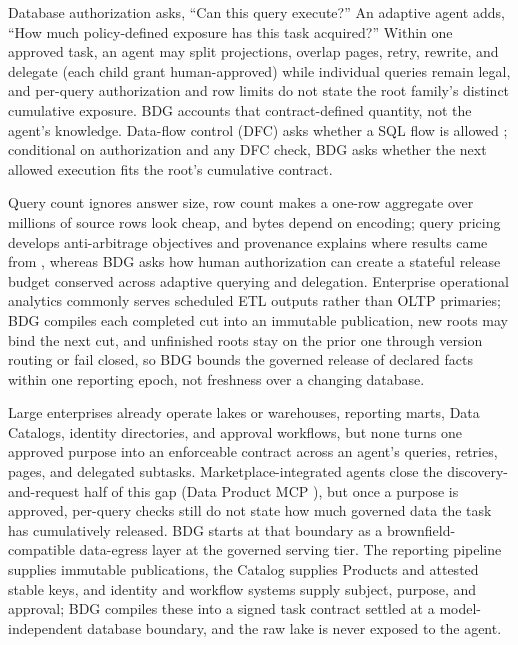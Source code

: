\documentclass[10pt,journal,compsoc]{IEEEtran}
\providecommand{\IEEEPARstart}[2]{#1#2}
\begin{document}
\IEEEPARstart{D}{atabase} authorization asks, ``Can this query execute?''
An adaptive agent adds, ``How much policy-defined exposure has this task
acquired?'' Within one approved task, an agent may split projections,
overlap pages, retry, rewrite, and delegate (each child grant
human-approved) while individual queries remain legal, and per-query
authorization and row limits do not state the root family's distinct
cumulative exposure. BDG accounts that contract-defined quantity, not the
agent's knowledge. Data-flow control (DFC) asks whether a SQL flow is
allowed \cite{summers2026dataflow,summers2026passant}; conditional on
authorization and any DFC check, BDG asks whether the next allowed execution
fits the root's cumulative contract.

Query count ignores answer size, row count makes a one-row aggregate over
millions of source rows look cheap, and bytes depend on encoding; query
pricing develops anti-arbitrage objectives
\cite{koutris2012query,deep2017qirana,peng2025aria} and provenance explains
where results came from \cite{green2007provenance,amsterdamer2011aggregate},
whereas BDG asks how human authorization can create a stateful release
budget conserved across adaptive querying and delegation. Enterprise
operational analytics commonly serves scheduled ETL outputs rather than
OLTP primaries; BDG compiles each completed cut into an immutable
publication, new roots may bind the next cut, and unfinished roots stay on
the prior one through version routing or fail closed, so BDG bounds the
governed release of declared facts within one reporting epoch, not
freshness over a changing database.

Large enterprises already operate lakes or warehouses, reporting marts, Data
Catalogs, identity directories, and approval workflows, but none turns one
approved purpose into an enforceable contract across an agent's queries,
retries, pages, and delegated subtasks. Marketplace-integrated agents close the discovery-and-request half of this
gap (Data Product MCP
\cite{tonnarelli2026dataproductmcp,dietz2025automating,bitol2025odcs}), but
once a purpose is approved, per-query checks still do not state how much
governed data the task has cumulatively released. BDG starts at that boundary
as a brownfield-compatible data-egress layer at the governed serving tier.
The reporting pipeline supplies immutable publications, the Catalog
supplies Products and attested stable keys, and identity and workflow
systems supply subject, purpose, and approval; BDG compiles these into a
signed task contract settled at a model-independent database boundary, and
the raw lake is never exposed to the agent.
\end{document}
